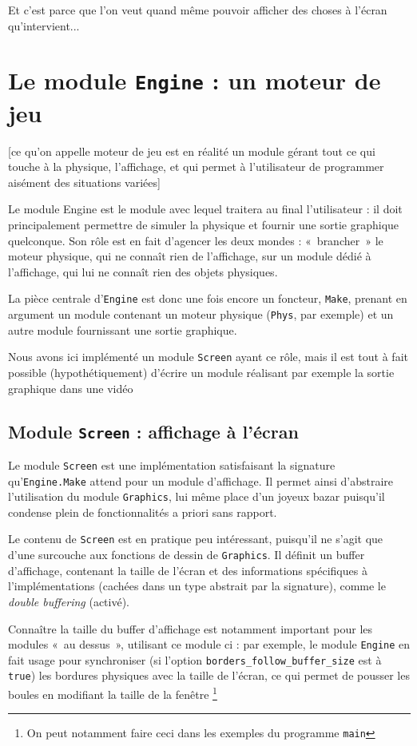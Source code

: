 \documentclass[a4paper]{scrartcl}
\begin{document}
Et c'est parce que l'on veut quand même pouvoir afficher des choses à
l'écran qu'intervient...

\section{Le module \texttt{Engine} : un moteur de jeu}

[ce qu'on appelle moteur de jeu est en réalité un module gérant tout
ce qui touche à la physique, l'affichage, et qui permet à
l'utilisateur de programmer aisément des situations variées]



Le module Engine est le module avec lequel traitera au final
l'utilisateur : il doit principalement permettre de simuler la
physique et fournir une sortie graphique quelconque. Son rôle est en
fait d'agencer les deux mondes : «~brancher~» le moteur physique, qui
ne connaît rien de l'affichage, sur un module dédié à l'affichage, qui
lui ne connaît rien des objets physiques.

La pièce centrale d'\texttt{Engine} est donc une fois encore un
foncteur, \texttt{Make}, prenant en argument un module contenant un
moteur physique (\texttt{Phys}, par exemple) et un autre module
fournissant une sortie graphique.

Nous avons ici implémenté un module \texttt{Screen} ayant ce rôle,
mais il est tout à fait possible (hypothétiquement) d'écrire un module
réalisant par exemple la sortie graphique dans une vidéo

\subsection{Module \texttt{Screen} : affichage à l'écran}
Le module \texttt{Screen} est une implémentation satisfaisant la
signature qu'\texttt{Engine.Make} attend pour un module
d'affichage. Il permet ainsi d'abstraire l'utilisation du module
\texttt{Graphics}, lui même place d'un joyeux bazar puisqu'il condense
plein de fonctionnalités a priori sans rapport.

Le contenu de \texttt{Screen} est en pratique peu intéressant,
puisqu'il ne s'agit que d'une surcouche aux fonctions de dessin de
\texttt{Graphics}. Il définit un buffer d'affichage, contenant la
taille de l'écran et des informations spécifiques à l'implémentations
(cachées dans un type abstrait par la signature), comme le
\emph{double buffering} (activé).

Connaître la taille du buffer d'affichage est notamment important pour
les modules «~au dessus~», utilisant ce module ci : par exemple, le
module \texttt{Engine} en fait usage pour synchroniser (si l'option
\texttt{borders\_follow\_buffer\_size} est à \texttt{true}) les bordures
physiques avec la taille de l'écran, ce qui permet de pousser les
boules en modifiant la taille de la fenêtre \footnote{On peut
  notamment faire ceci dans les exemples du programme \texttt{main}}
\end{document}
